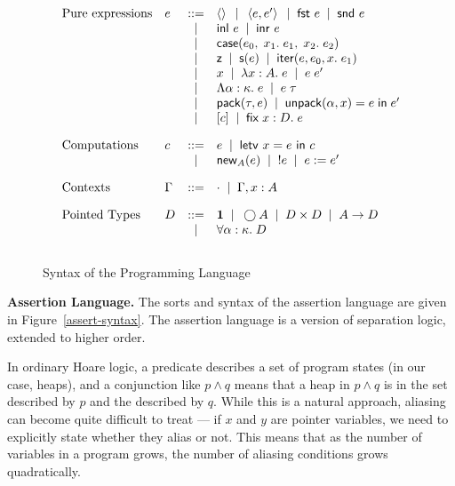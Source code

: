 \documentclass[preprint,natbib]{sigplanconf}
\begin{document}
\begin{figure}
\begin{displaymath}
  \begin{array}{llcl}
    \mbox{Pure expressions} & 
     e & ::= & 
         \left<\right> \;\;|\;\;
         \left<{e},{e'}\right> \;\;|\;\;
         \mbox{\textsf{{fst }}} e \;\;|\;\;
         \mbox{\textsf{{snd }}} e 
\\
     &&|& \mbox{\textsf{{inl }}}e \;\;|\;\;
          \mbox{\textsf{{inr }}}e  \\
     &&|& \mbox{\textsf{{case}}}(e_0,\; {x_1}.\; e_1,\; {x_2}.\; e_2) 
\\
     &&|& \mbox{\textsf{{z}}} \;\;|\;\; 
          \mbox{\textsf{{s}}}(e) \;\;|\;\; 
          \mbox{\textsf{{iter}}}(e, {e_0}, {x}.\; {e_1})
\\ 
     &&|& x \;\;|\;\; \lambda x:A.\;e \;\;|\;\; e\;e' 
\\ 
     &&|& \Lambda \alpha:\kappa.\;e \;\;|\;\; e\;\tau 
\\ 
     &&|& \mbox{\textsf{{pack}}}({\tau}, {e}) \;\;|\;\; \mbox{\textsf{{unpack}}}({\alpha}, {x}) = {e} \;\mbox{\textsf{{in}}}\;{e'} 
\\
     &&|& [c] \;\;|\;\; \mbox{\textsf{{fix}}}\;{x:D}.\;{e}
\\[1em]
  \mbox{Computations} & 
    c & ::= & e \;\;|\;\; \mbox{\textsf{{letv }}}x = e\mbox{\textsf{{ in }}}c \\
   &  &  |  & \mbox{\textsf{{new}}}_{A}(e) \;\;|\;\; !e \;\;|\;\; e := e'
\\[1em]
  \mbox{Contexts} & 
    \Gamma & ::= & \cdot \;\;|\;\; \Gamma, x:A 
\\[1em]
  \mbox{Pointed Types} & 
     D & ::= & \mathbf{1} \;\;|\;\; \bigcirc{A} \;\;|\;\; D \times D \;\;|\;\; A \to D  \\
    &  &  |  & \forall \alpha:\kappa.\; D 
\\[1em] 
  \end{array}
\end{displaymath}
\caption{Syntax of the Programming Language}
\label{lang-syntax}
\end{figure}


\textbf{Assertion Language.} The sorts and syntax of the assertion
language are given in Figure~\ref{assert-syntax}. The assertion
language is a version of separation logic, extended to higher order.


In ordinary Hoare logic, a predicate describes a set of program states
(in our case, heaps), and a conjunction like $p \land q$ means that a
heap in $p \land q$ is in the set described by $p$ and the described
by $q$. While this is a natural approach, aliasing can become quite
difficult to treat --- if $x$ and $y$ are pointer variables, we need to
explicitly state whether they alias or not. This means that as the
number of variables in a program grows, the number of aliasing
conditions grows quadratically. 
\end{document}

